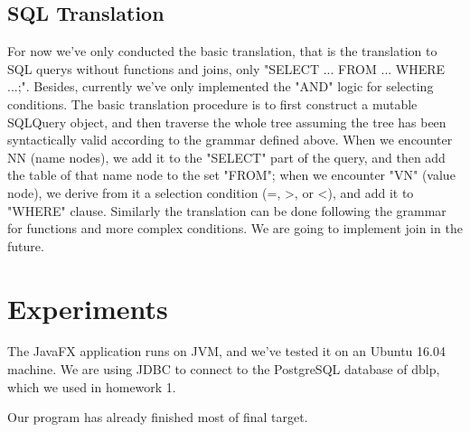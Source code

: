 \documentclass[twocolumn]{article}
\begin{document}
\subsection{SQL Translation}
For now we've only conducted the basic translation, that is the translation to SQL querys without functions and joins, only "SELECT ... FROM ... WHERE ...;". Besides, currently we've only implemented the "AND" logic for selecting conditions. The basic translation procedure is to first construct a mutable SQLQuery object, and then traverse the whole tree assuming the tree has been syntactically valid according to the grammar defined above. When we encounter NN (name nodes), we add it to the "SELECT" part of the query, and then add the table of that name node to the set "FROM"; when we encounter "VN" (value node), we derive from it a selection condition (=, >, or <), and add it to "WHERE" clause. Similarly the translation can be done following the grammar for functions and more complex conditions. We are going to implement join in the future.

\section{Experiments}
The JavaFX application runs on JVM, and we’ve tested it on an Ubuntu 16.04 machine. We are using JDBC to connect to the PostgreSQL database of dblp, which we used in homework 1.

Our program has already finished most of final target. 
\end{document}
